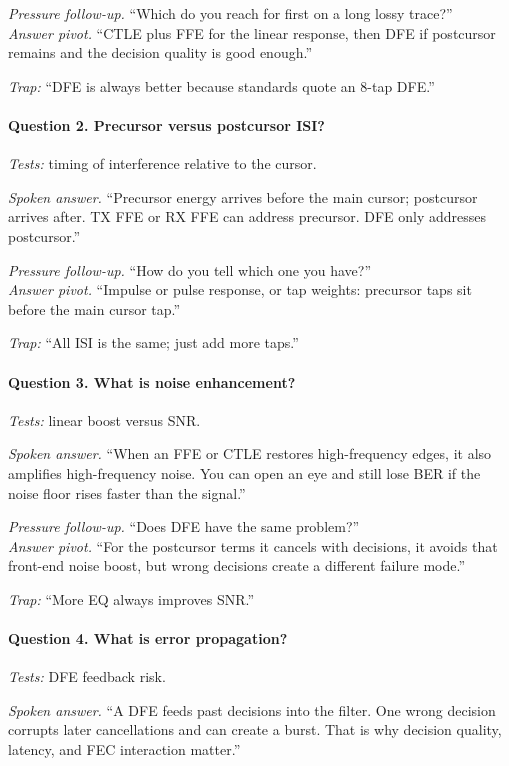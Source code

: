 \textit{Pressure follow-up.} ``Which do you reach for first on a long lossy
trace?''\\
\textit{Answer pivot.} ``CTLE plus FFE for the linear response, then DFE if
postcursor remains and the decision quality is good enough.''

\textit{Trap:} ``DFE is always better because standards quote an 8-tap DFE.''

\paragraph{Question 2. Precursor versus postcursor ISI?}
\textit{Tests:} timing of interference relative to the cursor.

\textit{Spoken answer.}
``Precursor energy arrives before the main cursor; postcursor arrives after. TX
FFE or RX FFE can address precursor. DFE only addresses postcursor.''

\textit{Pressure follow-up.} ``How do you tell which one you have?''\\
\textit{Answer pivot.} ``Impulse or pulse response, or tap weights: precursor
taps sit before the main cursor tap.''

\textit{Trap:} ``All ISI is the same; just add more taps.''

\paragraph{Question 3. What is noise enhancement?}
\textit{Tests:} linear boost versus SNR.

\textit{Spoken answer.}
``When an FFE or CTLE restores high-frequency edges, it also amplifies
high-frequency noise. You can open an eye and still lose BER if the noise
floor rises faster than the signal.''

\textit{Pressure follow-up.} ``Does DFE have the same problem?''\\
\textit{Answer pivot.} ``For the postcursor terms it cancels with decisions, it
avoids that front-end noise boost, but wrong decisions create a different
failure mode.''

\textit{Trap:} ``More EQ always improves SNR.''

\paragraph{Question 4. What is error propagation?}
\textit{Tests:} DFE feedback risk.

\textit{Spoken answer.}
``A DFE feeds past decisions into the filter. One wrong decision corrupts later
cancellations and can create a burst. That is why decision quality, latency, and
FEC interaction matter.''

